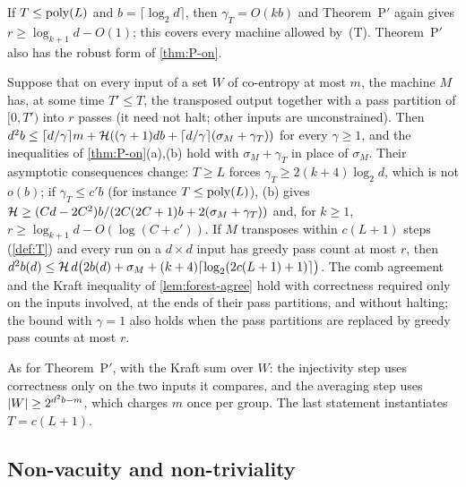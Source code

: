 If $T\le\operatorname{poly}(L)$ and $b=\lceil\log_2d\rceil$, then $\gamma_T=O(kb)$ and Theorem~P$'$ again gives
$r\ge\log_{k+1}d-O(1)$; this covers every machine allowed by~(T). Theorem~P$'$ also has the robust
form of \cref{thm:P-on}.

\begin{theorem}\label{thm:Pprime-on}
Suppose that on every input of a set $W$ of co-entropy at most $m$, the machine $M$ has, at some
time $T'\le T$, the transposed output together with a pass partition of $[0,T')$ into $r$ passes
(it need not halt; other inputs are unconstrained). Then
$d^2b\le\lceil d/\gamma\rceil m+\mathcal{H}((\gamma+1)db+\lceil d/\gamma\rceil(\sigma_M+\gamma_T))$ for
every $\gamma\ge1$, and the inequalities of \cref{thm:P-on}(a),(b) hold with $\sigma_M+\gamma_T$ in place
of $\sigma_M$. Their asymptotic consequences change: $T\ge L$ forces $\gamma_T\ge2(k+4)\log_2d$, which is
not $o(b)$; if $\gamma_T\le c'b$ (for instance $T\le\operatorname{poly}(L)$), (b) gives
$\mathcal{H}\ge(Cd-2C^2)b/(2C(2C+1)b+2(\sigma_M+\gamma_T))$ and, for $k\ge1$, $r\ge\log_{k+1}d-O(\log(C+c'))$. If $M$ transposes within $c(L+1)$ steps (\cref{def:T}) and every run on a $d\times d$ input has greedy pass count at most $r$, then
$d^2b(d)\le\mathcal{H}\,d\bigl(2b(d)+\sigma_M+(k+4)\lceil \log_2 (2c(L+1)+1) \rceil\bigr)$.
The comb agreement and the Kraft inequality of \cref{lem:forest-agree} hold with correctness required only on
the inputs involved, at the ends of their pass partitions, and without halting; the bound with $\gamma=1$ also
holds when the pass partitions are replaced by greedy pass counts at most $r$.
\end{theorem}

\begin{outline}
As for Theorem~P$'$, with the Kraft sum over $W$: the injectivity step uses correctness only on
the two inputs it compares, and the averaging step uses $\lvert W \rvert\ge2^{d^2b-m}$, which charges $m$
once per group. The last statement instantiates $T=c(L+1)$.
\end{outline}

\subsection{Non-vacuity and non-triviality}


